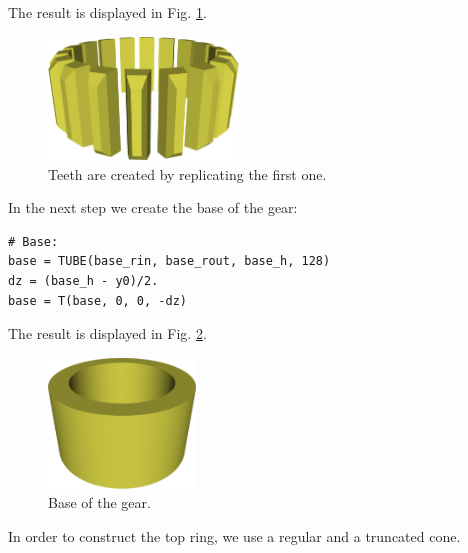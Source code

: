 \noindent
The result is displayed in Fig. \ref{fig:gear-2}.\\

\begin{figure}[!ht]
\begin{center}
\includegraphics[width=0.45\textwidth]{img/gear-2.png}
\end{center}
\vspace{-4mm}
\caption{Teeth are created by replicating the first one.}
\label{fig:gear-2}
\end{figure}
\noindent
In the next step we create the base of the gear:\\

{\small
\begin{bbox}
\begin{verbatim}
# Base:
base = TUBE(base_rin, base_rout, base_h, 128)
dz = (base_h - y0)/2.
base = T(base, 0, 0, -dz)
\end{verbatim}
\end{bbox}
}
\vspace{6mm}

\noindent
The result is displayed in Fig. \ref{fig:gear-3}.\\

\begin{figure}[!ht]
\begin{center}
\includegraphics[width=0.35\textwidth]{img/gear-3.png}
\end{center}
\vspace{-4mm}
\caption{Base of the gear.}
\label{fig:gear-3}
\end{figure}
\noindent
In order to construct the top ring, we use a regular and a truncated cone.\\

